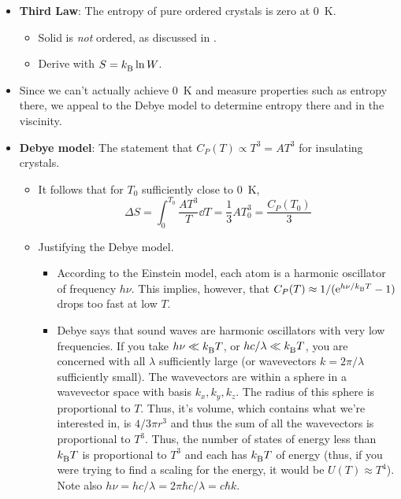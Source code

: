 \documentclass[../notes.tex]{subfiles}
\begin{document}
\begin{itemize}
\begin{itemize}
    \end{itemize}
    \item \textbf{Third Law}: The entropy of pure ordered crystals is zero at \SI{0}{\kelvin}.
    \begin{itemize}
        \item Solid  is \emph{not} ordered, as discussed in \textcite{bib:McQuarrieSimon}.
        \item Derive with $S=\kB\ln W$.
    \end{itemize}
    \item Since we can't actually achieve \SI{0}{\kelvin} and measure properties such as entropy there, we appeal to the Debye model to determine entropy there and in the viscinity.
    \item \textbf{Debye model}: The statement that $C_P(T)\propto T^3=AT^3$ for insulating crystals.
    \begin{itemize}
        \item It follows that for $T_0$ sufficiently close to \SI{0}{\kelvin},
        \begin{equation*}
            \Delta S = \int_0^{T_0}\frac{AT^3}{T}\dd{T}
            = \frac{1}{3}AT_0^3
            = \frac{C_P(T_0)}{3}
        \end{equation*}
        \item Justifying the Debye model.
        \begin{itemize}
            \item According to the Einstein model, each atom is a harmonic oscillator of frequency $h\nu$. This implies, however, that $C_P(T)\approx 1/(\e[h\nu/\kB T]-1)$ drops too fast at low $T$.
            \item Debye says that sound waves are harmonic oscillators with very low frequencies. If you take $h\nu\ll \kB T$, or $hc/\lambda\ll \kB T$, you are concerned with all $\lambda$ sufficiently large (or wavevectors $k=2\pi/\lambda$ sufficiently small). The wavevectors are within a sphere in a wavevector space with basis $k_x,k_y,k_z$. The radius of this sphere is proportional to $T$. Thus, it's volume, which contains what we're interested in, is $4/3\pi r^3$ and thus the sum of all the wavevectors is proportional to $T^3$. Thus, the number of states of energy less than $\kB T$ is proportional to $T^3$ and each has $\kB T$ of energy (thus, if you were trying to find a scaling for the energy, it would be $U(T)\approx T^4$). Note also $h\nu=hc/\lambda=2\pi\hbar c/\lambda=c\hbar k$.
        \end{itemize}

\end{itemize}
\end{itemize}
\end{document}
